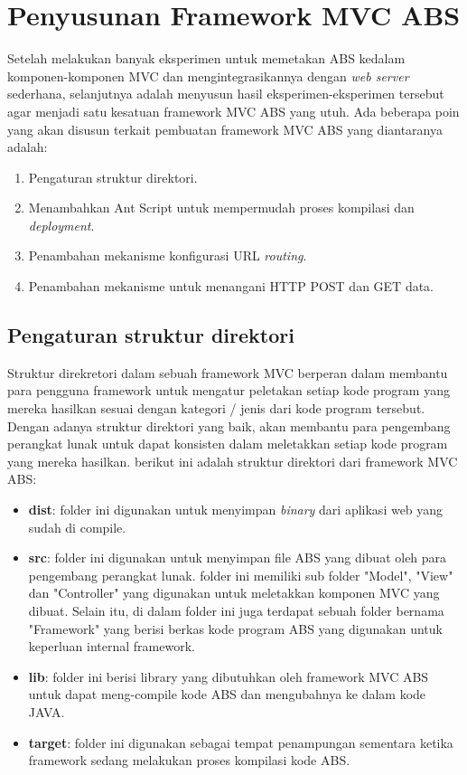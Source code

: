 \chapter{Penyusunan Framework MVC ABS}
Setelah melakukan banyak eksperimen untuk memetakan ABS kedalam komponen-komponen MVC dan mengintegrasikannya dengan \textit{web server} sederhana, selanjutnya adalah menyusun hasil eksperimen-eksperimen tersebut agar menjadi satu kesatuan framework MVC ABS yang utuh. Ada beberapa poin yang akan disusun terkait pembuatan framework MVC ABS yang diantaranya adalah:

\begin{enumerate}
    \item Pengaturan struktur direktori.
    \item Menambahkan Ant Script untuk mempermudah proses kompilasi dan \textit{deployment}.
    \item Penambahan mekanisme konfigurasi URL \textit{routing}.
    \item Penambahan mekanisme untuk menangani HTTP POST dan GET data.
\end{enumerate}

\section{Pengaturan struktur direktori}

Struktur direkretori dalam sebuah framework MVC berperan dalam membantu para pengguna framework untuk mengatur peletakan setiap kode program yang mereka hasilkan sesuai dengan kategori / jenis dari kode program tersebut. Dengan adanya struktur direktori yang baik, akan membantu para pengembang perangkat lunak untuk dapat konsisten dalam meletakkan setiap kode program yang mereka hasilkan. berikut ini adalah struktur direktori dari framework MVC ABS:

\begin{itemize}
    \item \textbf{dist}: folder ini digunakan untuk menyimpan \textit{binary} dari aplikasi web yang sudah di compile.
    \item \textbf{src}: folder ini digunakan untuk menyimpan file ABS yang dibuat oleh para pengembang perangkat lunak. folder ini memiliki sub folder "Model", "View" dan "Controller" yang digunakan untuk meletakkan komponen MVC yang dibuat. Selain itu, di dalam folder ini juga terdapat sebuah folder bernama "Framework" yang berisi berkas kode program ABS yang digunakan untuk keperluan internal framework.
    \item \textbf{lib}: folder ini berisi library yang dibutuhkan oleh framework MVC ABS untuk dapat meng-compile kode ABS dan mengubahnya ke dalam kode JAVA.
    \item \textbf{target}: folder ini digunakan sebagai tempat penampungan sementara ketika framework sedang melakukan proses kompilasi kode ABS.
\end{itemize}

